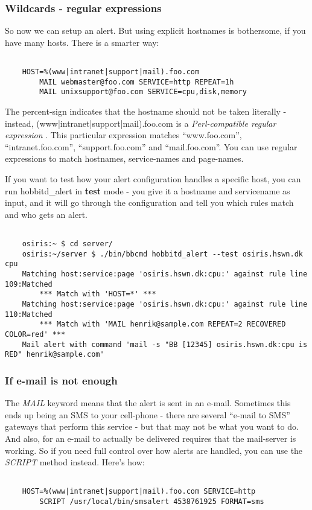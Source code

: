 \subsubsection{Wildcards - regular expressions}


 So now we can setup an alert. But using explicit hostnames is bothersome, if you have many hosts. There is a smarter way: \begin{verbatim}

	HOST=%(www|intranet|support|mail).foo.com
		MAIL webmaster@foo.com SERVICE=http REPEAT=1h
		MAIL unixsupport@foo.com SERVICE=cpu,disk,memory

\end{verbatim}



 The percent-sign indicates that the hostname should not be taken literally - instead, (www|intranet|support|mail).foo.com is a \emph{Perl-compatible regular expression}
. This particular expression matches ``www.foo.com'', ``intranet.foo.com'', ``support.foo.com'' and ``mail.foo.com''. You can use regular expressions to match hostnames, service-names and page-names.


 If you want to test how your alert configuration handles a specific host, you can run hobbitd\_alert in \textbf{test}
 mode - you give it a hostname and servicename as input, and it will go through the configuration and tell you which rules match and who gets an alert.
\begin{verbatim}

	osiris:~ $ cd server/
	osiris:~/server $ ./bin/bbcmd hobbitd_alert --test osiris.hswn.dk cpu
	Matching host:service:page 'osiris.hswn.dk:cpu:' against rule line 109:Matched
	    *** Match with 'HOST=*' ***
	Matching host:service:page 'osiris.hswn.dk:cpu:' against rule line 110:Matched
	    *** Match with 'MAIL henrik@sample.com REPEAT=2 RECOVERED COLOR=red' ***
	Mail alert with command 'mail -s "BB [12345] osiris.hswn.dk:cpu is RED" henrik@sample.com'

\end{verbatim}
\subsubsection{If e-mail is not enough}


 The \emph{MAIL}
 keyword means that the alert is sent in an e-mail. Sometimes this ends up being an SMS to your cell-phone - there are several ``e-mail to SMS'' gateways that perform this service - but that may not be what you want to do. And also, for an e-mail to actually be delivered requires that the mail-server is working. So if you need full control over how alerts are handled, you can use the \emph{SCRIPT}
 method instead. Here's how: \begin{verbatim}

	HOST=%(www|intranet|support|mail).foo.com SERVICE=http
		SCRIPT /usr/local/bin/smsalert 4538761925 FORMAT=sms

\end{verbatim}



